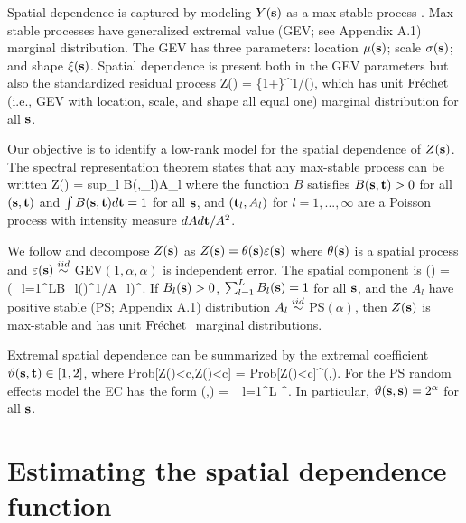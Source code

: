 \documentclass[11pt]{article}
\begin{document}
Spatial dependence is captured by modeling $Y(\mbox{\bf s})$ as a max-stable process \citep{deHaan2006}.
Max-stable processes have generalized extremal value (GEV; see Appendix A.1) marginal distribution.
The GEV has three parameters: location $\mu(\mbox{\bf s})$; scale $\sigma(\mbox{\bf s})$; and shape $\xi(\mbox{\bf s})$.
Spatial dependence is present both in the GEV parameters but also the standardized residual process
\beq\label{ebeq:Y2Z}
 Z(\bs) = \left\{1+\frac{\xi(\bs)}{\sigma(\bs)}\left[Y(\bs) - \mu(\bs)\right]\right\}^{1/\xi(\bs)},
\eeq which has unit $\mbox{Fr$\acute{\mbox{e}}$chet }$ (i.e., GEV with location, scale, and shape all equal one) marginal distribution for all $\mbox{\bf s}$.

Our objective is to identify a low-rank model for the spatial dependence of $Z(\mbox{\bf s})$.
The spectral representation theorem \citep{deHaan1984} states that any max-stable process can be written
\beq\label{ebeq:spectral}
  Z(\bs) = \mbox{sup}_l B(\bs,\bt_l)A_{l}
\eeq
where the function $B$ satisfies $B(\mbox{\bf s},\mbox{\bf t})>0$ for all $(\mbox{\bf s},\mbox{\bf t})$ and $\int B(\mbox{\bf s},\mbox{\bf t})d\mbox{\bf t}=1$ for all $\mbox{\bf s}$, and $(\mbox{\bf t}_l,A_l)$ for $l=1,...,\infty$ are a Poisson process with intensity measure $dA d\mbox{\bf t}/A^2$.

We follow \citet{Reich2012} and decompose  $Z(\mbox{\bf s})$ as $Z(\mbox{\bf s})=\theta(\mbox{\bf s})\varepsilon(\mbox{\bf s})$ where $\theta(\mbox{\bf s})$ is a spatial process and $\varepsilon(\mbox{\bf s})\stackrel{iid}{\sim}$ GEV$(1,\alpha,\alpha)$ is independent error.
The spatial component is
\beq \label{ebeq:theta}
  \theta(\bs) = \left(\sum_{l=1}^LB_{l}(\bs)^{1/\alpha}A_{l}\right)^{\alpha}.
\eeq
If $B_{l}(\mbox{\bf s})>0$, $\sum_{l=1}^LB_{l}(\mbox{\bf s})=1$ for all $\mbox{\bf s}$, and the $A_{l}$ have positive stable (PS; Appendix A.1) distribution $A_{l}\stackrel{iid}{\sim}$ PS$(\alpha)$, then $Z(\mbox{\bf s})$ is max-stable and has unit $\mbox{Fr$\acute{\mbox{e}}$chet }$ marginal distributions.

Extremal spatial dependence can be summarized by the extremal coefficient \citep[EC]{Schlather2003} $\vartheta(\mbox{\bf s},\mbox{\bf t})\in[1,2]$, where
\beq\label{ebeq:ECdev}
  \mbox{Prob}[Z(\bs)<c,Z(\bt)<c] = \mbox{Prob}[Z(\bs)<c]^{\vartheta(\bs,\bt)}.
\eeq
For the PS random effects model the EC has the form
\beq\label{ebeq:EC}
   \vartheta(\bs,\bt) = \sum_{l=1}^L ^\alpha.
\eeq
In particular, $\vartheta(\mbox{\bf s},\mbox{\bf s}) = 2^{\alpha}$ for all $\mbox{\bf s}$.

\section{Estimating the spatial dependence function}\label{ebs:estimation}
\end{document}
